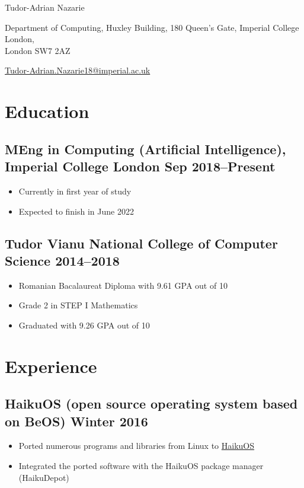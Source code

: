 \documentclass[a4paper]{article}
\begin{document}
\begin{center}
	{\huge\sffamily Tudor-Adrian Nazarie}

	\vspace{4pt}

	Department of Computing, Huxley Building, 180 Queen's Gate, Imperial
	College London,\\ London SW7 2AZ

	\vspace{4pt}

	\href{mailto:tudor-adrian.nazarie18@imperial.ac.uk}{Tudor-Adrian.Nazarie18@imperial.ac.uk}

	\vspace{-12pt}
\end{center}

\section*{Education}
\subsection*{MEng in Computing (Artificial Intelligence), Imperial College
London \hfill Sep 2018--Present}
\begin{itemize}
	\item Currently in first year of study
	\item Expected to finish in June 2022
\end{itemize}

\subsection*{Tudor Vianu National College of Computer Science \hfill
2014--2018}
\begin{itemize}
	\item Romanian Bacalaureat Diploma with 9.61 GPA out of 10
	\item Grade 2 in STEP I Mathematics
	\item Graduated with 9.26 GPA out of 10
\end{itemize}

\section*{Experience}
\subsection*{HaikuOS (open source operating system based on BeOS) \hfill Winter 2016}
\begin{itemize}
	\item Ported numerous programs and libraries from Linux to \href{https://www.haiku-os.org/}{HaikuOS}
	\item Integrated the ported software with the HaikuOS package manager
		(HaikuDepot)
\end{itemize}
\end{document}
